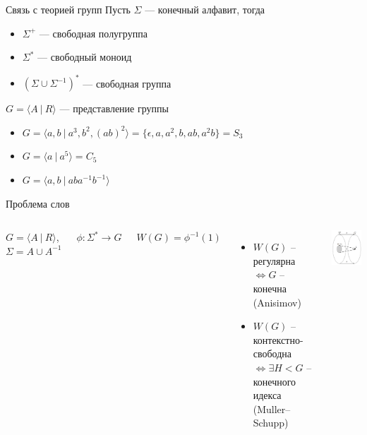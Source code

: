 \documentclass[xcolor=table]{beamer}
\begin{document}
\begin{frame}[fragile]{Связь с теорией групп}
        Пусть $\Sigma$ --- конечный алфавит, тогда
    \begin{itemize}
        \item $\Sigma^+$ --- свободная полугруппа
        \item $\Sigma^*$ --- свободный моноид
        \item $(\Sigma \cup \Sigma^{-1})^*$ --- свободная группа
    \end{itemize}
    \pause
        $G = \langle A~|~R \rangle$ --- представление группы
    \begin{itemize}
        \item $G = \langle a, b~|~a^3, b^2, (ab)^2 \rangle = \{\epsilon, a, a^2, b, ab, a^2b\} = S_3$
        \item $G = \langle a~|~a^5\rangle = C_5$
        \item $G = \langle a, b~|~aba^{-1}b^{-1} \rangle$
    \end{itemize}
\end{frame}

\begin{frame}[fragile]{Проблема слов}
    \begin{columns}[onlytextwidth,T]
        \column{\dimexpr\linewidth-60mm-5mm}
        $G = \langle A~|~R \rangle$, $\Sigma = A \cup A^{-1}$
        
        $\phi : \Sigma^* \to G$
        
        $W(G) = \phi^{-1}(1)$
        \newline
        \newline
        \begin{itemize}
            \item $W(G)$ -- регулярна $\iff G$ -- конечна (Anisimov)
            \item $W(G)$ -- контекстно-свободна $\iff \exists H < G$ -- конечного идекса (Muller–Schupp)
        \end{itemize}
        
        \column{60mm}
        \includegraphics[width=60mm]{pictures/3.png}
    \end{columns}
\end{frame}
\end{document}
